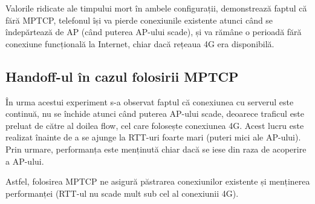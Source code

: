 Valorile ridicate ale timpului mort în ambele configurații, demonstrează faptul că fără MPTCP, telefonul își va pierde conexiunile existente atunci când se îndepărtează de AP (când puterea AP-ului scade), și va rămâne o perioadă fără conexiune funcțională la Internet, chiar dacă rețeaua 4G era disponibilă. 

\subsection{Handoff-ul în cazul folosirii MPTCP}

În urma acestui experiment s-a observat faptul că conexiunea cu serverul este continuă, nu se închide atunci când puterea AP-ului scade, deoarece traficul este preluat de către al doilea flow, cel care folosește conexiunea 4G. Acest lucru este realizat înainte de a se ajunge la RTT-uri foarte mari (puteri mici ale AP-ului). Prin urmare, performanța este menținută chiar dacă se iese din raza de acoperire a AP-ului.

Astfel, folosirea MPTCP ne asigură păstrarea conexiunilor existente și menținerea performanței (RTT-ul nu scade mult sub cel al conexiunii 4G).
